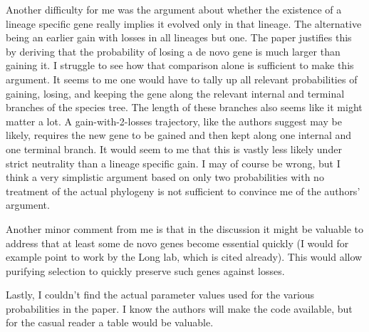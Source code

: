 \documentclass[12pt,a4paper]{article}
\begin{document}
Another difficulty for me was the argument about whether the existence of a lineage specific gene really implies it evolved only in that lineage. The alternative being an earlier gain with losses in all lineages but one. The paper justifies this by deriving that the probability of losing a de novo gene is much larger than gaining it. I struggle to see how that comparison alone is sufficient to make this argument. It seems to me one would have to tally up all relevant probabilities of gaining, losing, and keeping the gene along the relevant internal and terminal branches of the species tree. The length of these branches also seems like it might matter a lot. A gain-with-2-losses trajectory, like the authors suggest may be likely, requires the new gene to be gained and then kept along one internal and one terminal branch. It would seem to me that this is vastly less likely under strict neutrality than a lineage specific gain. I may of course be wrong, but I think a very simplistic argument based on only two probabilities with no treatment of the actual phylogeny is not sufficient to convince me of the authors' argument.

Another minor comment from me is that in the discussion it might be valuable to address that at least some de novo genes become essential quickly (I would for example point to work by the Long lab, which is cited already). This would allow purifying selection to quickly preserve such genes against losses.

Lastly, I couldn't find the actual parameter values used for the various probabilities in the paper. I know the authors will make the code available, but for the casual reader a table would be valuable.
\end{document}
